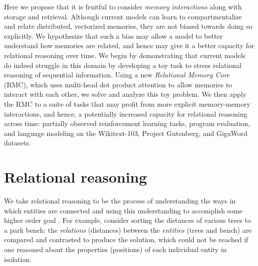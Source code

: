 \documentclass{article}
\begin{document}
Here we propose that it is fruitful to consider \textit{memory interactions} along with storage and retrieval. Although current models can learn to compartmentalize and relate distributed, vectorized memories, they are not biased towards doing so explicitly. We hypothesize that such a bias may allow a model to better understand how memories are related, and hence may give it a better capacity for relational reasoning over time. We begin by demonstrating that current models do indeed struggle in this domain by developing a toy task to stress relational reasoning of sequential information. Using a new \textit{Relational Memory Core} (RMC), which uses multi-head dot product attention to allow memories to interact with each other, we solve and analyze this toy problem. We then apply the RMC to a suite of tasks that may profit from more explicit memory-memory interactions, and hence, a potentially increased capacity for relational reasoning across time: partially observed reinforcement learning tasks, program evaluation, and language modeling on the Wikitext-103, Project Gutenberg, and GigaWord datasets.

\section{Relational reasoning}

We take relational reasoning to be the process of understanding the ways in which entities are connected and using this understanding to accomplish some higher order goal \citep{waltz1999system}. For example, consider sorting the distances of various trees to a park bench: the \textit{relations} (distances) between the \textit{entities} (trees and bench) are compared and contrasted to produce the solution, which could not be reached if one reasoned about the properties (positions) of each individual entity in isolation.
\end{document}
